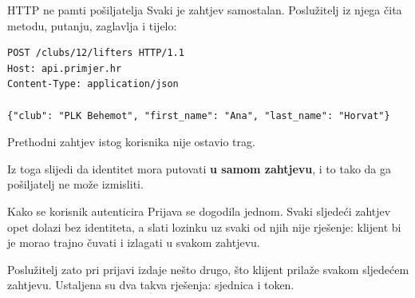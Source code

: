 
\begin{frame}[fragile]{HTTP ne pamti pošiljatelja}
Svaki je zahtjev samostalan. Poslužitelj iz njega čita metodu, putanju, zaglavlja i tijelo:

\begin{lstlisting}
POST /clubs/12/lifters HTTP/1.1
Host: api.primjer.hr
Content-Type: application/json

{"club": "PLK Behemot", "first_name": "Ana", "last_name": "Horvat"}
\end{lstlisting}

\vspace{1.1em}
Prethodni zahtjev istog korisnika nije ostavio trag.

\vspace{1.1em}
Iz toga slijedi da identitet mora putovati \textbf{u samom zahtjevu}, i to tako da ga pošiljatelj ne može izmisliti.
\end{frame}


\begin{frame}{Kako se korisnik autenticira}
Prijava se dogodila jednom. Svaki sljedeći zahtjev opet dolazi bez identiteta, a slati lozinku uz svaki od njih nije rješenje: klijent bi je morao trajno čuvati i izlagati u svakom zahtjevu.

\vspace{1.1em}
Poslužitelj zato pri prijavi izdaje nešto drugo, što klijent prilaže svakom sljedećem zahtjevu. Ustaljena su dva takva rješenja: sjednica i token.
\end{frame}

